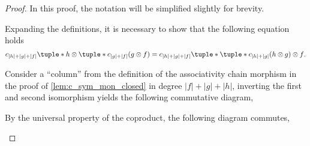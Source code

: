 \begin{proof}
    In this proof, the notation will be simplified slightly for brevity.

    Expanding the definitions, it is necessary to show that the following equation holds
    \begin{equation}
        \label{eq:dg-composition_associative}
        c_{|h| + |g| + |f|}\tuple*{h \otimes \tuple*{c_{|g| + |f|}(g \otimes f)}} = c_{|h| + |g| + |f|}\tuple*{\tuple*{c_{|h| + |g|}(h \otimes g)} \otimes f}.
    \end{equation}
  
    Consider a ``column'' from the definition of the associativity chain morphism in the proof of \autoref{lem:c_sym_mon_closed} in degree \( |f| + |g| + |h| \), inverting the first and second isomorphism yields the following commutative diagram,
    \begin{center}
    \end{center}
    By the universal property of the coproduct, the following diagram commutes,
    \begin{center}
\end{center}
\end{proof}
